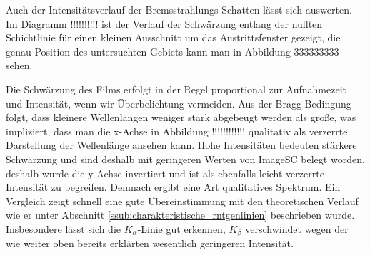 Auch der Intensitätsverlauf der Bremsstrahlungs-Schatten lässt sich auswerten.
Im Diagramm !!!!!!!!!! ist der Verlauf der Schwärzung entlang der nullten Schichtlinie für einen kleinen Ausschnitt um das Austrittsfenster gezeigt, die genau Position des untersuchten Gebiets kann man in Abbildung 333333333 sehen.


Die Schwärzung des Films erfolgt in der Regel proportional zur Aufnahmezeit und Intensität, wenn wir Überbelichtung vermeiden.
Aus der Bragg-Bedingung folgt, dass kleinere Wellenlängen weniger stark abgebeugt werden als große, was impliziert, dass man die x-Achse in Abbildung !!!!!!!!!!!! qualitativ als verzerrte Darstellung der Wellenlänge ansehen kann.
Hohe Intensitäten bedeuten stärkere Schwärzung und sind deshalb mit geringeren Werten von ImageSC belegt worden, deshalb wurde die y-Achse invertiert und ist als ebenfalls leicht verzerrte Intensität zu begreifen.
Demnach ergibt eine Art qualitatives Spektrum.
Ein Vergleich zeigt schnell eine gute Übereinstimmung mit den theoretischen Verlauf wie er unter Abschnitt \ref{ssub:charakteristische_rntgenlinien} beschrieben wurde.
Insbesondere lässt sich die $K_\alpha$-Linie gut erkennen, $K_\beta$ verschwindet wegen der wie weiter oben bereits erklärten wesentlich geringeren Intensität.